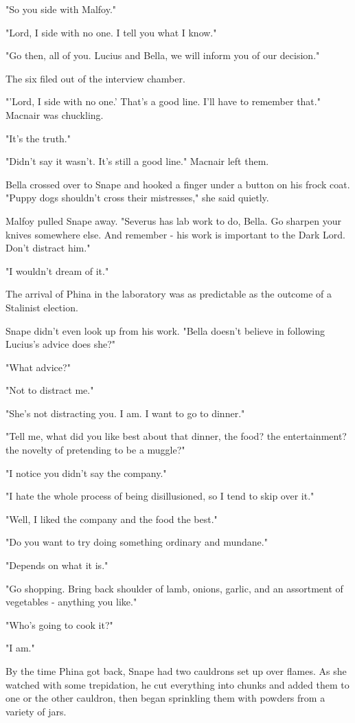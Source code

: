 \documentclass[a4paper,11pt]{article}
\begin{document}
"So you side with Malfoy."

"Lord, I side with no one. I tell you what I know."

"Go then, all of you. Lucius and Bella, we will inform you of our decision."

The six filed out of the interview chamber.

"'Lord, I side with no one.' That's a good line. I'll have to remember that." Macnair was chuckling.

"It's the truth."

"Didn't say it wasn't. It's still a good line." Macnair left them.

Bella crossed over to Snape and hooked a finger under a button on his frock coat. "Puppy dogs shouldn't cross their mistresses," she said quietly.

Malfoy pulled Snape away. "Severus has lab work to do, Bella. Go sharpen your knives somewhere else. And remember - his work is important to the Dark Lord. Don't distract him."

"I wouldn't dream of it."

The arrival of Phina in the laboratory was as predictable as the outcome of a Stalinist election.

Snape didn't even look up from his work. "Bella doesn't believe in following Lucius's advice does she?"

"What advice?"

"Not to distract me."

"She's not distracting you. I am. I want to go to dinner."

"Tell me, what did you like best about that dinner, the food? the entertainment? the novelty of pretending to be a muggle?"

"I notice you didn't say the company."

"I hate the whole process of being disillusioned, so I tend to skip over it."

"Well, I liked the company and the food the best."

"Do you want to try doing something ordinary and mundane."

"Depends on what it is."

"Go shopping. Bring back shoulder of lamb, onions, garlic, and an assortment of vegetables - anything you like."

"Who's going to cook it?"

"I am."

By the time Phina got back, Snape had two cauldrons set up over flames. As she watched with some trepidation, he cut everything into chunks and added them to one or the other cauldron, then began sprinkling them with powders from a variety of jars.
\end{document}
